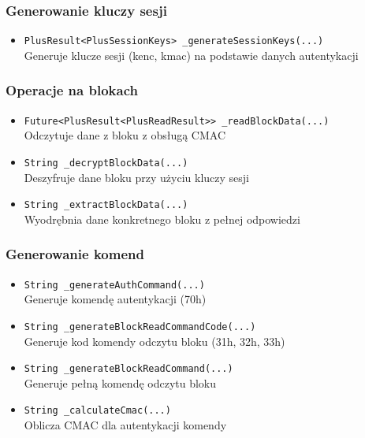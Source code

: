 \documentclass[a4paper,12pt]{article}
\begin{document}
\subsubsection*{Generowanie kluczy sesji}
\begin{itemize}
    \item \texttt{PlusResult<PlusSessionKeys> \_generateSessionKeys(...)}\\
    Generuje klucze sesji (kenc, kmac) na podstawie danych autentykacji
\end{itemize}

\subsubsection*{Operacje na blokach}
\begin{itemize}
    \item \texttt{Future<PlusResult<PlusReadResult>> \_readBlockData(...)}\\
    Odczytuje dane z bloku z obsługą CMAC
    
    \item \texttt{String \_decryptBlockData(...)}\\
    Deszyfruje dane bloku przy użyciu kluczy sesji
    
    \item \texttt{String \_extractBlockData(...)}\\
    Wyodrębnia dane konkretnego bloku z pełnej odpowiedzi
\end{itemize}

\subsubsection*{Generowanie komend}
\begin{itemize}
    \item \texttt{String \_generateAuthCommand(...)}\\
    Generuje komendę autentykacji (70h)
    
    \item \texttt{String \_generateBlockReadCommandCode(...)}\\
    Generuje kod komendy odczytu bloku (31h, 32h, 33h)
    
    \item \texttt{String \_generateBlockReadCommand(...)}\\
    Generuje pełną komendę odczytu bloku
    
    \item \texttt{String \_calculateCmac(...)}\\
    Oblicza CMAC dla autentykacji komendy
\end{itemize}
\end{document}
